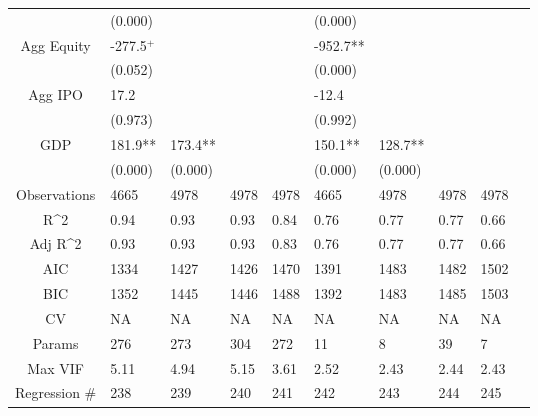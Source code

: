 \documentclass{article}
\begin{document}
\begin{table}[H]
\begin{tabular}{|clllllllll|}
   & (0.000) &  &  &  & (0.000) &  &  &  & \\ 
  Agg Equity & -277.5$^{+}$ &  &  &  & -952.7** &  &  &  & \\ 
   & (0.052) &  &  &  & (0.000) &  &  &  & \\ 
  Agg IPO & 17.2 &  &  &  & -12.4 &  &  &  & \\ 
   & (0.973) &  &  &  & (0.992) &  &  &  & \\ 
  GDP & 181.9** & 173.4** &  &  & 150.1** & 128.7** &  &  & \\ 
   & (0.000) & (0.000) &  &  & (0.000) & (0.000) &  &  & \\ 
  \hline 
 Observations & 4665 & 4978 & 4978 & 4978 & 4665 & 4978 & 4978 & 4978 & \\ 
  R^2 & 0.94 & 0.93 & 0.93 & 0.84 & 0.76 & 0.77 & 0.77 & 0.66 & \\ 
  Adj R^2 & 0.93 & 0.93 & 0.93 & 0.83 & 0.76 & 0.77 & 0.77 & 0.66 & \\ 
  AIC & 1334 & 1427 & 1426 & 1470 & 1391 & 1483 & 1482 & 1502 & \\ 
  BIC & 1352 & 1445 & 1446 & 1488 & 1392 & 1483 & 1485 & 1503 & \\ 
  CV & NA & NA & NA & NA & NA & NA & NA & NA & \\ 
  Params & 276 & 273 & 304 & 272 & 11 & 8 & 39 & 7 & \\ 
  Max VIF & 5.11 & 4.94 & 5.15 & 3.61 & 2.52 & 2.43 & 2.44 & 2.43 & \\ 
  Regression \# & 238 & 239 & 240 & 241 & 242 & 243 & 244 & 245 & \\ 
   \hline
\end{tabular}
 
\end{table}
\end{document}
